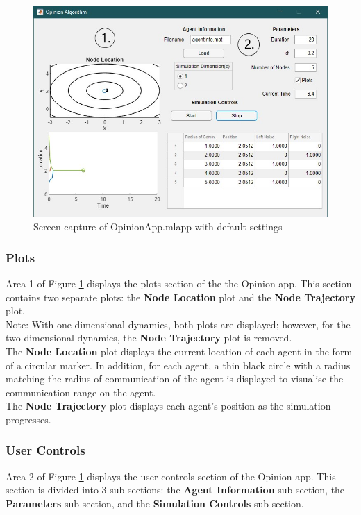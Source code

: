 \documentclass[../CourseManual.tex]{subfiles}
\begin{document}
\begin{figure}[H]
    \centering
    \includegraphics[width=350pt]{media/Opinion.jpg}
    \caption{Screen capture of OpinionApp.mlapp with default settings}
    \label{fig: opinion app}
\end{figure}

\subsubsection{Plots} \label{Plots: Opinion}
Area 1 of Figure \ref{fig: opinion app} displays the plots section of the the Opinion app. This section contains two separate plots: the \textbf{Node Location} plot and the \textbf{Node Trajectory} plot. \\

Note: With one-dimensional dynamics, both plots are displayed; however, for the two-dimensional dynamics, the \textbf{Node Trajectory} plot is removed. \\

The \textbf{Node Location} plot displays the current location of each agent in the form of a circular marker. In addition, for each agent, a thin black circle with a radius matching the radius of communication of the agent is displayed to visualise the communication range on the agent. \\ 
The \textbf{Node Trajectory} plot displays each agent's position as the simulation progresses. \\

\subsubsection{User Controls} \label{User Controls: Opinion}
Area 2 of Figure \ref{fig: opinion app} displays the user controls section of the Opinion app. This section is divided into 3 sub-sections: the \textbf{Agent Information} sub-section, the \textbf{Parameters} sub-section, and the \textbf{Simulation Controls} sub-section. \\
\end{document}
